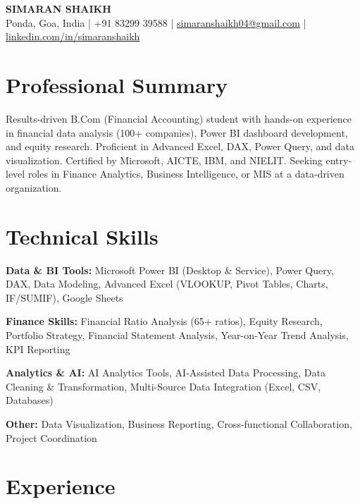 \documentclass[9pt, letterpaper]{article}
\begin{document}
\begin{center}
    {\LARGE \textbf{SIMARAN SHAIKH}} \\[3pt]
    Ponda, Goa, India \quad|\quad
    +91 83299 39588 \quad|\quad
    \href{mailto:simaranshaikh04@gmail.com}{simaranshaikh04@gmail.com} \quad|\quad
    \href{https://www.linkedin.com/in/simaranshaikh}{linkedin.com/in/simaranshaikh}
\end{center}

\section{Professional Summary}
Results-driven B.Com (Financial Accounting) student with hands-on experience in financial data analysis (100+ companies), Power BI dashboard development, and equity research. Proficient in Advanced Excel, DAX, Power Query, and data visualization. Certified by Microsoft, AICTE, IBM, and NIELIT. Seeking entry-level roles in Finance Analytics, Business Intelligence, or MIS at a data-driven organization.

\section{Technical Skills}
\begin{itemize}[leftmargin=0em, label={}]
  \small{
    \item \textbf{Data \& BI Tools:} Microsoft Power BI (Desktop \& Service), Power Query, DAX, Data Modeling, Advanced Excel (VLOOKUP, Pivot Tables, Charts, IF/SUMIF), Google Sheets
    \item \textbf{Finance Skills:} Financial Ratio Analysis (65+ ratios), Equity Research, Portfolio Strategy, Financial Statement Analysis, Year-on-Year Trend Analysis, KPI Reporting
    \item \textbf{Analytics \& AI:} AI Analytics Tools, AI-Assisted Data Processing, Data Cleaning \& Transformation, Multi-Source Data Integration (Excel, CSV, Databases)
    \item \textbf{Other:} Data Visualization, Business Reporting, Cross-functional Collaboration, Project Coordination
  }
\end{itemize}

\section{Experience}
\end{document}
